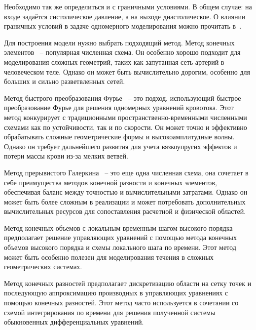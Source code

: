 Необходимо так же определиться и с граничными условиями. В общем случае: на входе задаётся  систолическое давление, 
а на выходе диастолическое. О влиянии граничных условий в задаче одномерного моделирования можно прочитать в~\cite{Krivovichev:2022}.

Для построения модели нужно выбрать подходящий метод. Метод конечных элементов~\cite{TAYLOR1998} -- популярная численная схема. 
Он особенно хорошо подходит для моделирования сложных геометрий, таких как запутанная сеть артерий в человеческом теле. 
Однако он может быть вычислительно дорогим, особенно для больших и сильно разветвленных сетей. 

Метод быстрого преобразования Фурье~\cite{Sazonov:2019} -- 
это подход, использующий быстрое преобразование Фурье для решения одномерных уравнений кровотока. 
Этот метод конкурирует с традиционными пространственно-временными численными схемами как по устойчивости, так и по скорости. 
Он может точно и эффективно обрабатывать сложные геометрические формы и высокоамплитудные волны. 
Однако он требует дальнейшего развития для учета вязкоупругих эффектов и потери массы крови из-за мелких ветвей. 

Метод прерывистого Галеркина~\cite{yao:2017} -- это еще одна численная схема, она сочетает в себе преимущества методов конечной разности и конечных элементов, 
обеспечивая баланс между точностью и вычислительными затратами. Однако он может быть более сложным в реализации и может
потребовать дополнительных вычислительных ресурсов для сопоставления расчетной и физической областей.

Метод конечных объемов с локальным временным шагом высокого порядка~\cite{mueller:2015} предполагает решение управляющих уравнений 
с помощью метода конечных объемов высокого порядка и схемы локального шага по времени. 
Этот метод может быть особенно полезен для моделирования течения в сложных геометрических системах.

Метод конечных разностей предполагает дискретизацию области на сетку точек и последующую аппроксимацию производных в управляющих
уравнениях с помощью конечных разностей. Этот метод часто используется в сочетании со схемой интегрирования по времени для решения 
полученной системы обыкновенных дифференциальных уравнений.


